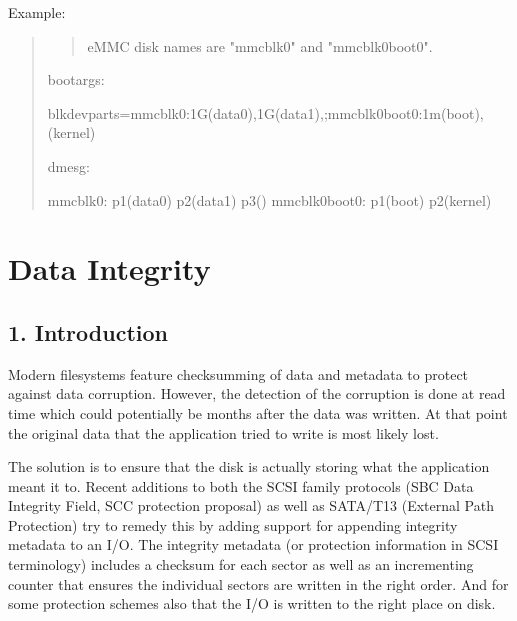 \documentclass[a4paper,11pt,english]{sphinxmanual}
\begin{document}
Example:
\begin{quote}
\begin{quote}

eMMC disk names are "mmcblk0" and "mmcblk0boot0".
\end{quote}

bootargs:

\begin{sphinxVerbatim}[commandchars=\\\{\}]
\PYGZsq{}blkdevparts=mmcblk0:1G(data0),1G(data1),\PYGZhy{};mmcblk0boot0:1m(boot),\PYGZhy{}(kernel)\PYGZsq{}
\end{sphinxVerbatim}

dmesg:

\begin{sphinxVerbatim}[commandchars=\\\{\}]
mmcblk0: p1(data0) p2(data1) p3()
mmcblk0boot0: p1(boot) p2(kernel)
\end{sphinxVerbatim}
\end{quote}


\chapter{Data Integrity}
\label{\detokenize{data-integrity:data-integrity}}\label{\detokenize{data-integrity::doc}}

\section{1. Introduction}
\label{\detokenize{data-integrity:introduction}}
Modern filesystems feature checksumming of data and metadata to
protect against data corruption.  However, the detection of the
corruption is done at read time which could potentially be months
after the data was written.  At that point the original data that the
application tried to write is most likely lost.

The solution is to ensure that the disk is actually storing what the
application meant it to.  Recent additions to both the SCSI family
protocols (SBC Data Integrity Field, SCC protection proposal) as well
as SATA/T13 (External Path Protection) try to remedy this by adding
support for appending integrity metadata to an I/O.  The integrity
metadata (or protection information in SCSI terminology) includes a
checksum for each sector as well as an incrementing counter that
ensures the individual sectors are written in the right order.  And
for some protection schemes also that the I/O is written to the right
place on disk.
\end{document}
